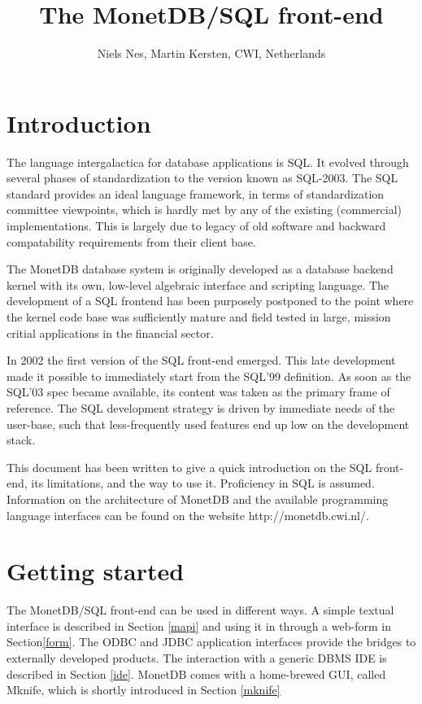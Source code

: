 \documentclass[10pt,twocolumn,fleqn]{article}
\begin{document}
\title{The MonetDB/SQL front-end}
\author{ Niels Nes, Martin Kersten, {\small \textsc{CWI}, Netherlands}}
\date{}
\maketitle

\section{Introduction}
The language intergalactica for database applications is SQL. It evolved
through several phases of standardization to the version known as SQL-2003.
The SQL standard provides an ideal language framework, 
in terms of standardization committee viewpoints, 
which is hardly met by any of the existing (commercial) implementations.
This is largely due to legacy of old software and backward compatability
requirements from their client base.
 
The MonetDB database system is originally developed as a database backend
kernel with its own, low-level algebraic interface and scripting language.
The development of a SQL frontend has been purposely postponed to the point
where the kernel code base was sufficiently mature and field tested in
large, mission critial applications in the financial sector.

In 2002 the first version of the SQL front-end emerged. 
This late development made it possible to immediately start from the SQL'99
definition. As soon as the SQL'03 spec became available, its content
was taken as the primary frame of reference.
The SQL development strategy is driven by immediate needs of the
user-base, such that less-frequently used features end up low on
the development stack.

This document has been written to give a quick introduction on the SQL
front-end, its limitations, and the way to use it. 
Proficiency in SQL is assumed.
Information on the architecture of MonetDB and the available programming
language interfaces can be found on the website http://monetdb.cwi.nl/.

\section{Getting started}
The MonetDB/SQL front-end can be used in different ways. 
A simple textual interface is described in Section \ref{mapi} and
using it in through a web-form in Section\ref{form}.
The ODBC and JDBC application interfaces provide the bridges
to externally developed products. The interaction with
a generic DBMS IDE is described in Section \ref{ide}.
MonetDB comes with a home-brewed GUI, called Mknife, which
is shortly introduced in Section \ref{mknife}
\end{document}
